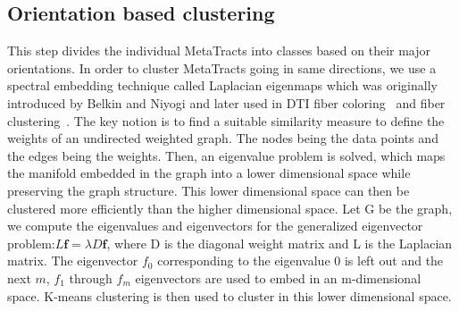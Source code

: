 \subsection {Orientation based clustering}
This step divides the individual MetaTracts into classes based on their major orientations. In order to cluster MetaTracts going in same directions, we use a spectral embedding technique called Laplacian eigenmaps which was originally introduced by Belkin and Niyogi \cite{Belkin01} and later used in DTI fiber coloring~\cite{Brun2003} and fiber clustering~\cite{Brun2004}. The key notion is to find a suitable similarity measure to define the weights of an undirected weighted graph. The nodes being the data points and the edges being the weights. Then, an eigenvalue problem is solved, which maps the manifold embedded in the graph into a lower dimensional space while preserving the graph structure.
This lower dimensional space can then be clustered more efficiently than the higher dimensional space. 
Let G be the graph, we compute the eigenvalues and eigenvectors for the generalized eigenvector problem:$L\textbf{f}=\lambda D\textbf{f}$,
where D is the diagonal weight matrix and L is the Laplacian matrix. The eigenvector \textbf{${f}_{0}$} corresponding to the eigenvalue 0 is left out and the next $m$, {\textbf{${f}_{1}$} through \textbf{${f}_{m}$}} eigenvectors are used to embed in an m-dimensional space. K-means clustering is then used to cluster in this lower dimensional space.

